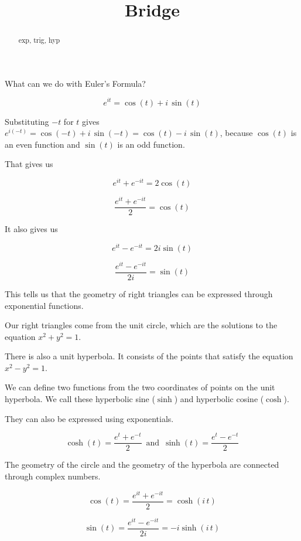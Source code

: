 \documentclass{ximera}
\title{Bridge}
\begin{document}
\begin{abstract}
exp, trig, hyp
\end{abstract}
\maketitle





What can we do with Euler's Formula?



\[ e^{i t} = \cos(t) + i \, \sin(t) \]

Substituting $-t$ for $t$ gives $e^{i (-t)} = \cos(-t) + i \, \sin(-t) = \cos(t) - i \, \sin(t)$, because $\cos(t)$ is an even function and $\sin(t)$ is an odd function.



That gives us 

\[   e^{i t}  + e^{-i t} = 2 \cos(t)    \]


\[   \frac{e^{i t}  + e^{-i t}}{2} = \cos(t)    \]


It also gives us 



\[   e^{i t}  - e^{-i t} = 2 i \sin(t)    \]


\[   \frac{e^{i t}  - e^{-i t}}{2 i} = \sin(t)    \]


This tells us that the geometry of right triangles can be expressed through exponential functions.

Our right triangles come from the unit circle, which are the solutions to the equation $x^2 + y^2 = 1$.


There is also a unit hyperbola.  It consists of the points that satisfy the equation $x^2 - y^2 = 1$.

We can define two functions from the two coordinates of points on the unit hyperbola.  We call these hyperbolic sine ($\sinh$) and hyperbolic cosine ($\cosh$).


They can also be expressed using exponentials.


\[  \cosh(t)  = \frac{e^t + e^{-t}}{2}      \,   \text{ and } \,  \sinh(t)  = \frac{e^t - e^{-t}}{2}     \]



The geometry of the circle and the geometry of the hyperbola are connected through complex numbers.

\[  \cos(t) =  \frac{e^{i t} + e^{-i t}}{2} = \cosh(i \, t)      \]




\[  \sin(t) =  \frac{e^{i t} - e^{-i t}}{2 i} = -i \sinh(i \, t)      \]
\end{document}
